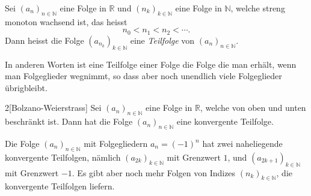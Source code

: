 \documentclass[../main.tex]{subfiles}
\begin{document}
\begin{definition}
  Sei ${(a_n)}_{n \in \mathbb{N}}$ eine Folge in $\mathbb{R}$ 
  und ${(n_k)}_{k \in \mathbb{N}}$ eine Folge in $\mathbb{N}$,
  welche streng monoton wachsend ist, das heisst
  \[
    n_0 < n_1 < n_2 < \cdots.
  \]
  Dann heisst die Folge ${(a_{n_k})}_{k \in \mathbb{N}}$ 
eine \emph{Teilfolge} von ${(a_n)}_{n \in \mathbb{N}}$.
\end{definition}

In anderen Worten ist eine Teilfolge einer Folge
die Folge die man erhält, wenn man Folgeglieder
wegnimmt, so dass aber noch unendlich viele
Folgeglieder übrigbleibt.

\begin{manualtheorem}{2}[Bolzano-Weierstrass]
  Sei ${(a_n)}_{n \in \mathbb{N}}$ eine Folge in $\mathbb{R}$,
  welche von oben und unten beschränkt ist.
  Dann hat die Folge ${(a_n)}_{n \in \mathbb{N}}$
  eine konvergente Teilfolge.
\end{manualtheorem}

\begin{example}
  Die Folge ${(a_n)}_{n \in \mathbb{N}}$ mit Folgegliedern
  $a_n = {(-1)}^n$ hat zwei naheliegende konvergente Teilfolgen,
  nämlich ${(a_{2k})}_{k \in \mathbb{N}}$ mit Grenzwert $1$,
  und ${(a_{2k+1})}_{k \in \mathbb{N}}$ mit Grenzwert $-1$.
  Es gibt aber noch mehr Folgen von Indizes 
  ${(n_k)}_{k \in \mathbb{N}}$, die
  konvergente Teilfolgen liefern.
\end{example}
\end{document}
